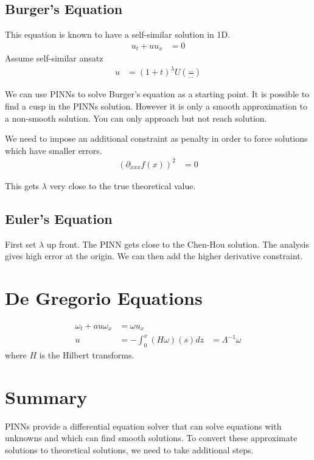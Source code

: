 \documentclass[book.tex]{subfiles}
\begin{document}
\subsection{Burger's Equation}

This equation is known to have a self-similar solution in 1D.
\begin{align}
u_t + u u_x &= 0
\end{align}
Assume self-similar ansatz
\begin{align}
u &= (1+t)^\lambda U\left ( \frac{...}{...}\right )
\end{align}

We can use PINNs to solve Burger's equation as a starting point. It is possible to find a cusp in the PINNs solution. However it is only a smooth approximation to a non-smooth solution. You can only approach but not reach solution.

We need to impose an additional constraint as penalty in order to force solutions which have smaller errors.
\begin{align}
(\partial_{xxx} f(x))^2 &= 0
\end{align}

This gets $\lambda$ very close to the true theoretical value. 

\subsection{Euler's Equation}

First set $\lambda$ up front. The PINN gets close to the Chen-Hou solution. The analysis gives high error at the origin. We can then add the higher derivative constraint.

\section{De Gregorio Equations}
\begin{align}
\omega_t + a u \omega_x &= \omega u_x \\
u &= - \int_0^x (H\omega)(s) dz &= \Lambda^{-1} \omega
\end{align}
where $H$ is the Hilbert transforms.

\section{Summary}

PINNs provide a differential equation solver that can solve equations with unknowns and which can find smooth solutions. To convert these approximate solutions to theoretical solutions, we need to take additional steps.
\end{document}
